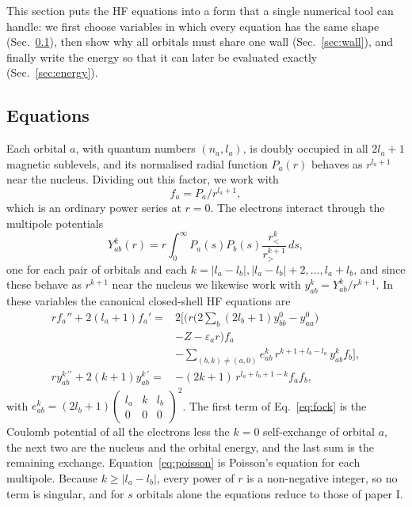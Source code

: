\documentclass[aps,pra,reprint,superscriptaddress,amsmath,amssymb,longbibliography]{revtex4-2}
\begin{document}
This section puts the HF equations into a form that a single numerical tool can handle: we first choose variables in which every equation has the same shape (Sec.~\ref{sec:equations}), then show why all orbitals must share one wall (Sec.~\ref{sec:wall}), and finally write the energy so that it can later be evaluated exactly (Sec.~\ref{sec:energy}).

\subsection{Equations}\label{sec:equations}

Each orbital $a$, with quantum numbers $(n_a,l_a)$, is doubly occupied in all $2l_a+1$ magnetic sublevels, and its normalised radial function $P_a(r)$ behaves as $r^{l_a+1}$ near the nucleus. Dividing out this factor, we work with
\begin{equation}
f_a=P_a/r^{l_a+1},
\end{equation}
which is an ordinary power series at $r=0$. The electrons interact through the multipole potentials
\begin{equation}
Y^k_{ab}(r)=r\int_0^\infty P_a(s)P_b(s)\frac{r_<^k}{r_>^{k+1}}\,ds,
\end{equation}
one for each pair of orbitals and each $k=|l_a-l_b|,|l_a-l_b|+2,\dots,l_a+l_b$, and since these behave as $r^{k+1}$ near the nucleus we likewise work with $y^k_{ab}=Y^k_{ab}/r^{k+1}$. In these variables the canonical closed-shell HF equations are
\begin{align}
rf_a''+2(l_a+1)f_a'={}&2\Big[\Big(r\Big(2\sum_b(2l_b+1)y^0_{bb}-y^0_{aa}\Big) \nonumber\\
&-Z-\varepsilon_ar\Big)f_a \nonumber\\
&-\sum_{(b,k)\ne(a,0)}e^k_{ab}\,r^{k+1+l_b-l_a}\,y^k_{ab}f_b\Big], \label{eq:fock}\\
ry^{k\,\prime\prime}_{ab}+2(k+1)y^{k\,\prime}_{ab}={}&-(2k+1)\,r^{l_a+l_b+1-k}f_af_b, \label{eq:poisson}
\end{align}
with $e^k_{ab}=(2l_b+1)\begin{pmatrix}l_a&k&l_b\\0&0&0\end{pmatrix}^2$. The first term of Eq.~\eqref{eq:fock} is the Coulomb potential of all the electrons less the $k=0$ self-exchange of orbital $a$, the next two are the nucleus and the orbital energy, and the last sum is the remaining exchange. Equation~\eqref{eq:poisson} is Poisson's equation for each multipole. Because $k\ge|l_a-l_b|$, every power of $r$ is a non-negative integer, so no term is singular, and for $s$ orbitals alone the equations reduce to those of paper I.
\end{document}
